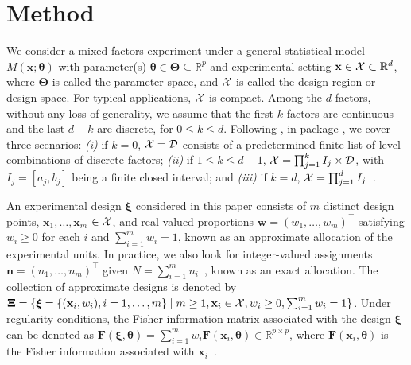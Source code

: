 \section{Method}\label{sec:ForLion}

We consider a mixed-factors experiment under a general statistical model $M(\mathbf x; \boldsymbol \theta)$ with parameter(s) $\boldsymbol \theta \in \boldsymbol{\Theta} \subseteq \mathbb{R}^p$ and experimental setting ${\mathbf x} \in {\cal X} \subset \mathbb{R}^d$, where $\boldsymbol{\Theta}$ is called the parameter space, and ${\cal X}$ is called the design region or design space. For typical applications, ${\cal X}$ is compact. Among the $d$ factors, without any loss of generality, we assume that the first $k$ factors are continuous and the last $d-k$ are discrete, for $0\le k \le d$. Following \cite{lin2025ew}, in package , we cover three scenarios: {\it (i)} if $k=0$, ${\cal X} = {\cal D}$ consists of a predetermined finite list of level combinations of discrete factors; {\it (ii)} if $1\leq k\leq d-1$, ${\cal X} = \prod_{j=1}^k I_j\times {\cal D}$, with $I_j=[a_j, b_j]$ being a finite closed interval; and {\it (iii)} if $k=d$, ${\cal X} = \prod_{j=1}^d I_j$~. 

An experimental design $\boldsymbol{\xi}$ considered in this paper consists of $m$ distinct design points, $\mathbf x_1, \dots, \mathbf x_m$ $\in {\cal X}$, and real-valued proportions ${\mathbf w} = (w_1, \ldots, w_m)^\top$ satisfying $w_i\geq 0$ for each $i$ and  $\sum_{i=1}^m w_i = 1$, known as an approximate allocation of the experimental units. In practice, we also look for integer-valued assignments ${\mathbf n} = (n_1, \ldots, n_m)^\top$ given $N=\sum_{i=1}^m n_i$~, known as an exact allocation. The collection of approximate designs is denoted by $\boldsymbol{\Xi} = \{\boldsymbol{\xi} = \{({\mathbf x}_i, w_i), i=1, \ldots, m\} \mid m\geq 1, {\mathbf x}_i \in {\cal X}, w_i\geq 0, \sum_{i=1}^m w_i = 1\}$.
Under regularity conditions, the Fisher information matrix associated with the design $\boldsymbol{\xi}$ can be denoted as ${\mathbf F}(\boldsymbol{\xi}, \boldsymbol{\theta}) = \sum_{i=1}^m w_i {\mathbf F}({\mathbf x}_i, \boldsymbol{\theta}) \in \mathbb{R}^{p\times p}$, where ${\mathbf F}({\mathbf x}_i, \boldsymbol{\theta})$ is the Fisher information associated with ${\mathbf x}_i$~.

